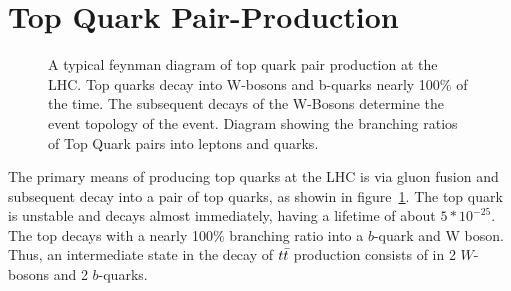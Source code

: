 \section{Top Quark Pair-Production}

\begin{figure}
  \begin{center}

  \end{center}
  \caption{A typical feynman diagram of top quark pair production at the LHC.
    Top quarks decay into W-bosons and b-quarks nearly 100\% of the time.
    The subsequent decays of the W-Bosons determine the event topology of the \ttbar event.
    Diagram showing the branching ratios of Top Quark pairs into leptons and quarks.}
  \label{img:TopQuarkPairProduction}
\end{figure}

The primary means of producing top quarks at the LHC is via gluon fusion and subsequent decay into a pair of top quarks, as showin in figure~\ref{img:TopQuarkPairProduction}.
The top quark is unstable and decays almost immediately, having a lifetime of about $5*10^{-25}$\cite{PARTICLE_DATA_GROUP}.
The top decays with a nearly 100\% branching ratio into a $b$-quark and W boson.
Thus, an intermediate state in the decay of $t\bar{t}$ production consists of in 2 $W$-bosons and 2 $b$-quarks.

